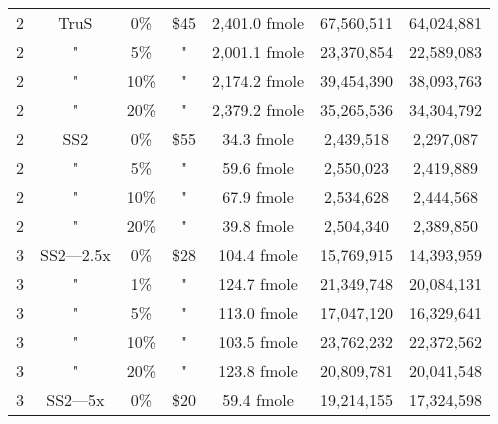 \begin{table}[htdp]
\begin{center}
\begin{tabular}{|c|c|c|c|c|c|c|}
2 & TruS & 0\% & \$45 & 2,401.0 fmole & 67,560,511 &64,024,881 \\
2 & " & 5\% & " & 2,001.1 fmole & 23,370,854 &22,589,083 \\
2 & " & 10\% & " & 2,174.2 fmole & 39,454,390 &38,093,763 \\
2 & " & 20\% & " & 2,379.2 fmole & 35,265,536 &34,304,792 \\
2 & SS2 & 0\% & \$55 & 34.3 fmole & 2,439,518 &2,297,087 \\
2 & " & 5\% & " & 59.6 fmole & 2,550,023 &2,419,889 \\
2 & " & 10\% & " & 67.9 fmole & 2,534,628 &2,444,568 \\
2 & " & 20\% & " & 39.8 fmole & 2,504,340 &2,389,850 \\
3 & SS2---2.5x & 0\% & \$28 & 104.4 fmole & 15,769,915 &14,393,959 \\
3 & " & 1\% & " & 124.7 fmole & 21,349,748 &20,084,131 \\
3 & " & 5\% & " & 113.0 fmole & 17,047,120 &16,329,641 \\
3 & " & 10\% & " & 103.5 fmole & 23,762,232 &22,372,562 \\
3 & " & 20\% & " & 123.8 fmole & 20,809,781 &20,041,548 \\
3 & SS2---5x & 0\% & \$20 & 59.4 fmole & 19,214,155 &17,324,598 \\

\end{tabular}
\end{center}
\end{table}
